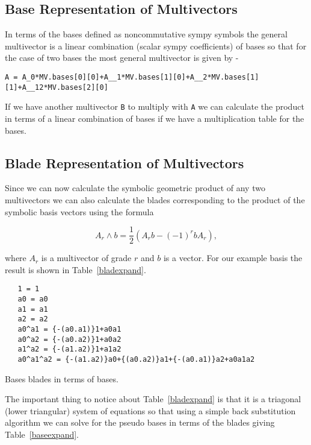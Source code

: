\documentclass[10pt]{article}
\newcommand{\lp}{\left (}
\newcommand{\rp}{\right )}
\newcommand{\half}{\frac{1}{2}}
\newcommand{\W}{\wedge}
\newcommand{\T}[1]{\texttt{#1}}
\begin{document}
\subsection{Base Representation of Multivectors}

In terms of the bases defined as noncommutative sympy symbols the general multivector
is a linear combination (scalar sympy coefficients) of bases so that for the case
of two bases the most general multivector is given by -

\begin{lstlisting}
A = A_0*MV.bases[0][0]+A__1*MV.bases[1][0]+A__2*MV.bases[1][1]+A__12*MV.bases[2][0]
\end{lstlisting}

If we have another multivector \T{B} to multiply with \T{A} we can calculate the product in
terms of a linear combination of bases if we have a multiplication table for the bases.

\subsection{Blade Representation of Multivectors}

Since we can now calculate the symbolic geometric product of any two
multivectors we can also calculate the blades corresponding to the product of
the symbolic basis vectors using the formula

  \begin{equation}
    A_{r}\W b = \half\lp A_{r}b-\lp -1 \rp^{r}bA_{r} \rp,
  \end{equation}

where $A_{r}$ is a multivector of grade $r$ and $b$ is a
vector.  For our example basis the result is shown in Table~\ref{bladexpand}.

\begin{table}
\begin{lstlisting}
   1 = 1
   a0 = a0
   a1 = a1
   a2 = a2
   a0^a1 = {-(a0.a1)}1+a0a1
   a0^a2 = {-(a0.a2)}1+a0a2
   a1^a2 = {-(a1.a2)}1+a1a2
   a0^a1^a2 = {-(a1.a2)}a0+{(a0.a2)}a1+{-(a0.a1)}a2+a0a1a2
\end{lstlisting}
\caption{Bases blades in terms of bases.}\label{bladexpand}
\end{table}

The important thing to notice about Table~\ref{bladexpand} is that it is a
triagonal (lower triangular) system of equations so that using a simple back
substitution algorithm we can solve for the pseudo bases in terms of the blades
giving Table~\ref{baseexpand}.
\end{document}
